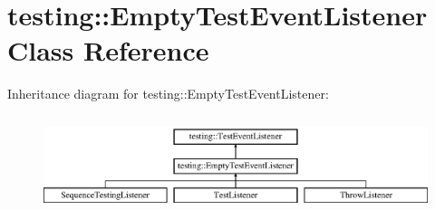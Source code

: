 \hypertarget{classtesting_1_1EmptyTestEventListener}{}\section{testing\+:\+:Empty\+Test\+Event\+Listener Class Reference}
\label{classtesting_1_1EmptyTestEventListener}
Inheritance diagram for testing\+:\+:Empty\+Test\+Event\+Listener\+:\begin{figure}[H]
\begin{center}
\leavevmode
\includegraphics[height=2.857143cm]{classtesting_1_1EmptyTestEventListener}
\end{center}
\end{figure}
